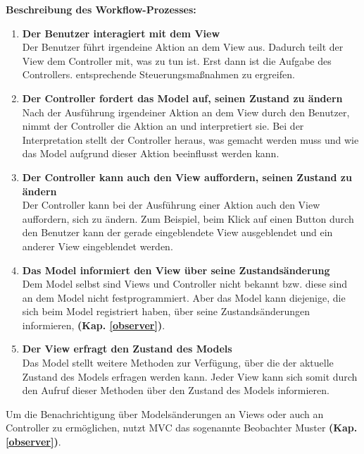 \textbf{Beschreibung des Workflow-Prozesses:}
\begin{enumerate}
\item \textbf{Der Benutzer interagiert mit dem View}\\
Der Benutzer führt irgendeine Aktion an dem View aus. Dadurch teilt der View dem Controller mit, was zu tun ist. Erst dann ist die Aufgabe des Controllers. entsprechende Steuerungsmaßnahmen zu ergreifen.

\item  \textbf{Der Controller fordert das Model auf, seinen Zustand zu ändern}\\
Nach der Ausführung irgendeiner Aktion an dem View durch den Benutzer, nimmt der Controller die Aktion an und interpretiert sie. Bei der Interpretation stellt der Controller heraus, was gemacht werden muss und wie das Model aufgrund dieser Aktion beeinflusst werden kann.

\item  \textbf{Der Controller kann auch den View auffordern, seinen Zustand zu ändern}\\
Der Controller kann bei der Ausführung einer Aktion auch den View auffordern, sich zu ändern. Zum Beispiel, beim Klick auf einen Button durch den Benutzer kann der gerade eingeblendete View ausgeblendet und ein anderer View eingeblendet werden.

\item  \textbf{Das Model informiert den View über seine Zustandsänderung}\\
Dem Model selbst sind Views und Controller nicht bekannt bzw. diese sind an dem Model nicht festprogrammiert. Aber das Model kann diejenige, die sich beim Model registriert haben, über seine Zustandsänderungen informieren, \textbf{(Kap. \ref{observer})}.

\item  \textbf{Der View erfragt den Zustand des Models}\\
Das Model stellt weitere Methoden zur Verfügung, über die der aktuelle Zustand des Models erfragen werden kann. 
Jeder View kann sich somit durch den Aufruf dieser Methoden über den Zustand des Models informieren.

\end{enumerate}
Um die Benachrichtigung über Modelsänderungen an Views oder auch an Controller zu ermöglichen, nutzt MVC das sogenannte Beobachter Muster \textbf{(Kap. \ref{observer})}.

